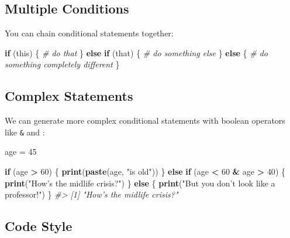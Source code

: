 \documentclass[]{book}
\newenvironment{Shaded}{\begin{snugshade}}{\end{snugshade}}
\newcommand{\KeywordTok}[1]{\textcolor[rgb]{0.13,0.29,0.53}{\textbf{#1}}}
\newcommand{\DecValTok}[1]{\textcolor[rgb]{0.00,0.00,0.81}{#1}}
\newcommand{\StringTok}[1]{\textcolor[rgb]{0.31,0.60,0.02}{#1}}
\newcommand{\CommentTok}[1]{\textcolor[rgb]{0.56,0.35,0.01}{\textit{#1}}}
\newcommand{\ControlFlowTok}[1]{\textcolor[rgb]{0.13,0.29,0.53}{\textbf{#1}}}
\newcommand{\OperatorTok}[1]{\textcolor[rgb]{0.81,0.36,0.00}{\textbf{#1}}}
\newcommand{\NormalTok}[1]{#1}
\begin{document}
\subsection{Multiple Conditions}\label{multiple-conditions}

You can chain conditional statements together:

\begin{Shaded}
\begin{Highlighting}[]
\ControlFlowTok{if}\NormalTok{ (this) \{}
  \CommentTok{# do that}
\NormalTok{\} }\ControlFlowTok{else} \ControlFlowTok{if}\NormalTok{ (that) \{}
  \CommentTok{# do something else}
\NormalTok{\} }\ControlFlowTok{else}\NormalTok{ \{}
  \CommentTok{# do something completely different}
\NormalTok{\}}
\end{Highlighting}
\end{Shaded}

\subsection{Complex Statements}\label{complex-statements}

We can generate more complex conditional statements with boolean
operators like \texttt{\&} and \texttt{\textbar{}}:

\begin{Shaded}
\begin{Highlighting}[]
\NormalTok{age =}\StringTok{ }\DecValTok{45} 

\ControlFlowTok{if}\NormalTok{ (age }\OperatorTok{>}\StringTok{ }\DecValTok{60}\NormalTok{) \{}
    \KeywordTok{print}\NormalTok{(}\KeywordTok{paste}\NormalTok{(age, }\StringTok{"is old"}\NormalTok{))}
\NormalTok{\} }\ControlFlowTok{else} \ControlFlowTok{if}\NormalTok{ (age }\OperatorTok{<}\StringTok{ }\DecValTok{60} \OperatorTok{&}\StringTok{ }\NormalTok{age }\OperatorTok{>}\StringTok{ }\DecValTok{40}\NormalTok{) \{}
    \KeywordTok{print}\NormalTok{(}\StringTok{"How's the midlife crisis?"}\NormalTok{)}
\NormalTok{\} }\ControlFlowTok{else}\NormalTok{ \{}
    \KeywordTok{print}\NormalTok{(}\StringTok{"But you don't look like a professor!"}\NormalTok{)}
\NormalTok{\}}
\CommentTok{#> [1] "How's the midlife crisis?"}
\end{Highlighting}
\end{Shaded}

\subsection{Code Style}\label{code-style}
\end{document}
